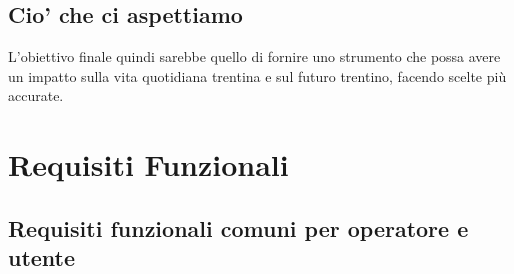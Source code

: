 \documentclass{article}
\begin{document}
\subsection{Cio' che ci aspettiamo}
L’obiettivo finale quindi sarebbe quello di fornire uno strumento che possa avere un impatto sulla vita quotidiana trentina e sul futuro trentino, facendo scelte più accurate.

\section{Requisiti Funzionali}

\subsection{Requisiti funzionali comuni per operatore e utente}
\end{document}
